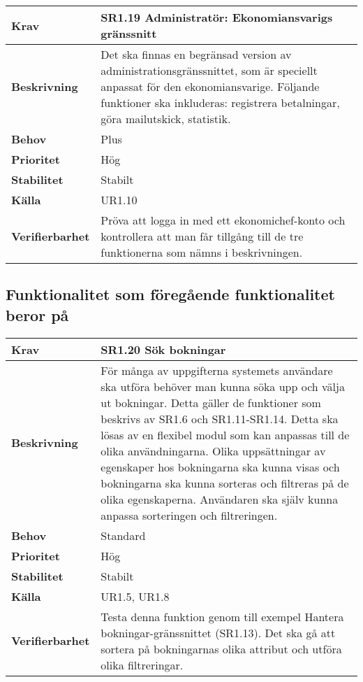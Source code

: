 \documentclass[a4paper, twoside, 11pt, titlepage]{article}
\begin{document}
		\begin{tabular} { p{2.6cm} p{12.5cm} }
			\hline
			\sffamily\textbf{Krav} & \sffamily\textbf{SR1.19 Administratör: Ekonomiansvarigs gränssnitt } \\
			\hline
			\sffamily\textbf{Beskrivning} & Det ska finnas en begränsad version av administrationsgränssnittet, som är speciellt anpassat för den ekonomiansvarige. Följande funktioner ska inkluderas: registrera betalningar, göra mailutskick, statistik.  \\
			\hline
			\sffamily\textbf{Behov} & Plus  \\
			\hline
			\sffamily\textbf{Prioritet} & Hög  \\
			\hline
			\sffamily\textbf{Stabilitet} & Stabilt  \\
			\hline
			\sffamily\textbf{Källa} & UR1.10  \\
			\hline
			\sffamily\textbf{Verifierbarhet} & Pröva att logga in med ett ekonomichef-konto och kontrollera att man får tillgång till de tre funktionerna som nämns i beskrivningen.  \\
			\hline
		\end{tabular}


	\subsection{Funktionalitet som föregående funktionalitet beror på}


	\begin{tabular} { p{2.6cm} p{12.5cm} }
		\hline
		\sffamily\textbf{Krav} & \sffamily\textbf{SR1.20 Sök bokningar } \\
		\hline
		\sffamily\textbf{Beskrivning} & För många av uppgifterna systemets användare ska utföra behöver man kunna söka upp och välja ut bokningar. Detta gäller de funktioner som beskrivs av SR1.6 och SR1.11-SR1.14. Detta ska lösas av en flexibel modul som kan anpassas till de olika användningarna. Olika uppsättningar av egenskaper hos bokningarna ska kunna visas och bokningarna ska kunna sorteras och filtreras på de olika egenskaperna. Användaren ska själv kunna anpassa sorteringen och filtreringen.  \\
		\hline
		\sffamily\textbf{Behov} & Standard  \\
		\hline
		\sffamily\textbf{Prioritet} & Hög  \\
		\hline
		\sffamily\textbf{Stabilitet} & Stabilt  \\
		\hline
		\sffamily\textbf{Källa} & UR1.5, UR1.8  \\
		\hline
		\sffamily\textbf{Verifierbarhet} & Testa denna funktion genom till exempel Hantera bokningar-gränssnittet (SR1.13). Det ska gå att sortera på bokningarnas olika attribut och utföra olika filtreringar.  \\
		\hline
	\end{tabular}
	\vspace{6mm}
\end{document}
